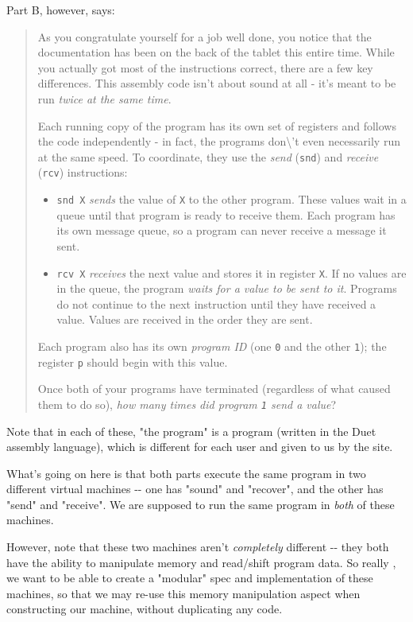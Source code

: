 \documentclass[]{article}
\begin{document}
Part B, however, says:

\begin{quote}
As you congratulate yourself for a job well done, you notice that the
documentation has been on the back of the tablet this entire time. While you
actually got most of the instructions correct, there are a few key differences.
This assembly code isn't about sound at all - it's meant to be run \emph{twice
at the same time}.

Each running copy of the program has its own set of registers and follows the
code independently - in fact, the programs don\textbackslash{}'t even
necessarily run at the same speed. To coordinate, they use the \emph{send}
(\texttt{snd}) and \emph{receive} (\texttt{rcv}) instructions:

\begin{itemize}
\tightlist
\item
  \texttt{snd\ X} \emph{sends} the value of \texttt{X} to the other program.
  These values wait in a queue until that program is ready to receive them. Each
  program has its own message queue, so a program can never receive a message it
  sent.
\item
  \texttt{rcv\ X} \emph{receives} the next value and stores it in register
  \texttt{X}. If no values are in the queue, the program \emph{waits for a value
  to be sent to it}. Programs do not continue to the next instruction until they
  have received a value. Values are received in the order they are sent.
\end{itemize}

Each program also has its own \emph{program ID} (one \texttt{0} and the other
\texttt{1}); the register \texttt{p} should begin with this value.

Once both of your programs have terminated (regardless of what caused them to do
so), \emph{how many times did program \texttt{1} send a value}?
\end{quote}

Note that in each of these, "the program" is a program (written in the Duet
assembly language), which is different for each user and given to us by the
site.

What's going on here is that both parts execute the same program in two
different virtual machines -\/- one has "sound" and "recover", and the other has
"send" and "receive". We are supposed to run the same program in \emph{both} of
these machines.

However, note that these two machines aren't \emph{completely} different -\/-
they both have the ability to manipulate memory and read/shift program data. So
really , we want to be able to create a "modular" spec and implementation of
these machines, so that we may re-use this memory manipulation aspect when
constructing our machine, without duplicating any code.
\end{document}

